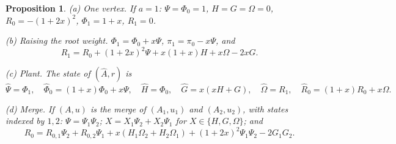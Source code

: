 \documentclass[11pt]{amsart}
\newtheorem{proposition}[theorem]{Proposition}
\theoremstyle{definition}
\theoremstyle{remark}
\begin{document}
\begin{proposition}\label{prop:rules}
\textup{(a) One vertex.} If $a=1$: $\Psi=\Phi_0=1$, $H=G=\Omega=0$,
$R_0=-(1+2x)^2$, $\Phi_1=1+x$, $R_1=0$.

\textup{(b) Raising the root weight.} $\Phi_1=\Phi_0+x\Psi$,
$\pi_1=\pi_0-x\Psi$, and
\[
R_1=R_0+(1+2x)^2\Psi+x(1+x)H+x\Omega-2xG .
\]

\textup{(c) Plant.} The state of $(\hat A,r)$ is
\[
\hat\Psi=\Phi_1,\quad \hat\Phi_0=(1+x)\Phi_0+x\Psi,\quad \hat H=\Phi_0,\quad
\hat G=x(xH+G),\quad \hat\Omega=R_1,\quad \hat R_0=(1+x)R_0+x\Omega .
\]

\textup{(d) Merge.} If $(A,u)$ is the merge of $(A_1,u_1)$ and $(A_2,u_2)$,
with states indexed by $1,2$: $\Psi=\Psi_1\Psi_2$; $X=X_1\Psi_2+X_2\Psi_1$ for
$X\in\{H,G,\Omega\}$; and
\[
R_0=R_{0,1}\Psi_2+R_{0,2}\Psi_1+x(H_1\Omega_2+H_2\Omega_1)+(1+2x)^2\Psi_1\Psi_2-2G_1G_2 .
\]
\end{proposition}
\end{document}
